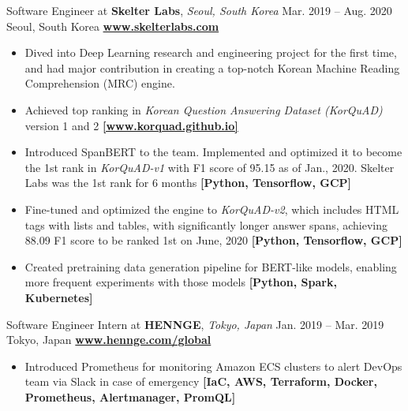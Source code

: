 \documentclass[10pt,a4paper]{altacv}
\begin{document}
    \cveventflat
    {Software Engineer at }
    {\textbf{Skelter Labs}, \textit{Seoul, South Korea}}
    {Mar. 2019 -- Aug. 2020}
    {Seoul, South Korea}
    \newline
    \href{https://www.skelterlabs.com/}{\textbf{www.skelterlabs.com}}
    \begin{itemize}
        \item Dived into Deep Learning research and engineering project for the first time, and had major contribution in creating a top-notch Korean Machine Reading Comprehension (MRC) engine.
        \item Achieved top ranking in \textit{Korean Question Answering Dataset (KorQuAD)} version 1 and 2
        \href{https://korquad.github.io/}{\textbf{[www.korquad.github.io]}}
        \item Introduced SpanBERT to the team. Implemented and optimized it to become the 1st rank in \textit{KorQuAD-v1} with F1 score of 95.15 as of Jan., 2020. Skelter Labs was the 1st rank for 6 months
        \textbf{[Python, Tensorflow, GCP]}
        \item Fine-tuned and optimized the engine to \textit{KorQuAD-v2}, which includes HTML tags with lists and tables, with significantly longer answer spans, achieving 88.09 F1 score to be ranked 1st on June, 2020
        \textbf{[Python, Tensorflow, GCP]}
        \item Created pretraining data generation pipeline for BERT-like models, enabling more frequent experiments with those models
        \textbf{[Python, Spark, Kubernetes]}
    \end{itemize}

    \medskip

    \cveventflat
    {Software Engineer Intern at }
    {\textbf{HENNGE}, \textit{Tokyo, Japan}}
    {Jan. 2019 -- Mar. 2019}
    {Tokyo, Japan}
    \newline
    \href{https://hennge.com/global/}{\textbf{www.hennge.com/global}}
    \begin{itemize}
        \item Introduced Prometheus for monitoring Amazon ECS clusters to alert DevOps team via Slack in case of emergency
        \textbf{[IaC, AWS, Terraform, Docker, Prometheus, Alertmanager, PromQL]}
    \end{itemize}
\end{document}
